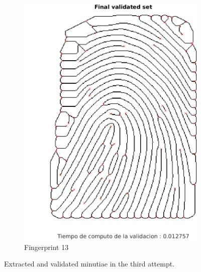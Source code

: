 \documentclass[11pt]{article}
\begin{document}
\begin{figure}[h!]
\begin{subfigure}[t]{0.45\textwidth}
         \includegraphics[scale=0.5]{img/13_3-7-3}
         \caption{Fingerprint 13}
     \end{subfigure}
    \caption{Extracted and validated minutiae in the third attempt.}
    \label{fig:final-minutiae}
\end{figure}
\end{document}
